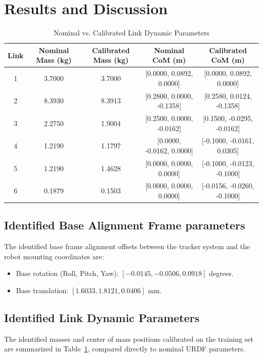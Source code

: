 \documentclass[journal]{IEEEtran}
\begin{document}
\section{Results and Discussion}
\begin{table}[h]
	\centering
	\caption{Nominal vs. Calibrated Link Dynamic Parameters}
	\label{tab:dynamics}
	\begin{tabular}{ccccc}
		\toprule
		\textbf{Link} & \textbf{Nominal Mass (kg)} & \textbf{Calibrated Mass (kg)} & \textbf{Nominal CoM (m)} & \textbf{Calibrated CoM (m)} \\
		\midrule
		1 & 3.7000 & 3.7000 & [0.0000, 0.0892, 0.0000] & [0.0000, 0.0892, 0.0000] \\
		2 & 8.3930 & 8.3913 & [0.2800, 0.0000, -0.1358] & [0.2580, 0.0124, -0.1358] \\
		3 & 2.2750 & 1.9004 & [0.2500, 0.0000, -0.0162] & [0.1500, -0.0295, -0.0162] \\
		4 & 1.2190 & 1.1797 & [0.0000, -0.0162, 0.0000] & [-0.1000, -0.0161, 0.0305] \\
		5 & 1.2190 & 1.4628 & [0.0000, 0.0000, 0.0000] & [-0.1000, -0.0123, -0.1000] \\
		6 & 0.1879 & 0.1503 & [0.0000, 0.0000, 0.0000] & [-0.0156, -0.0260, -0.1000] \\
		\bottomrule
	\end{tabular}
\end{table}

\subsection{Identified Base Alignment Frame parameters}
The identified base frame alignment offsets between the tracker system and the robot mounting coordinates are:
\begin{itemize}
    \item Base rotation (Roll, Pitch, Yaw): $[-0.0145, -0.0506, 0.0918]$ degrees.
    \item Base translation: $[1.6033, 1.8121, 0.0406]$ mm.
\end{itemize}

\subsection{Identified Link Dynamic Parameters}
The identified masses and center of mass positions calibrated on the training set are summarized in Table~\ref{tab:dynamics}, compared directly to nominal URDF parameters.
\end{document}
